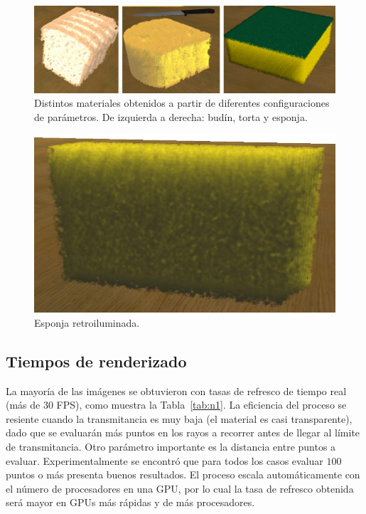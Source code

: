 \documentclass[oneside,a4paper,spanish,links]{amca}
\begin{document}
\begin{figure}[htb!]
  \centerline{\includegraphics[scale=0.3]{fig6}}
  \caption{Distintos materiales obtenidos a partir de diferentes
    configuraciones de parámetros. De izquierda a derecha: budín,
    torta y esponja. }
  \label{fg:fig6}

\end{figure}

\begin{figure}[htb!]
  \centerline{\includegraphics[scale=0.25]{fig7}}
  \caption{Esponja retroiluminada.}
  \label{fg:fig7}
\end{figure}

\subsection{Tiempos de renderizado}

La mayoría de las imágenes se obtuvieron con tasas de refresco de
tiempo real (más de 30 FPS), como muestra la Tabla~\ref{tab:n1}. La
eficiencia del proceso se resiente cuando la transmitancia es muy
baja (el material es casi transparente), dado que se evaluarán más
puntos en los rayos a recorrer antes de llegar al límite de
transmitancia. Otro parámetro importante es la distancia entre puntos
a evaluar. Experimentalmente se encontró que para todos los casos
evaluar $100$ puntos o más presenta buenos resultados. El proceso escala
automáticamente con el número de procesadores en una GPU, por lo cual
la tasa de refresco obtenida será mayor en GPUs más rápidas y de más
procesadores.
\end{document}
